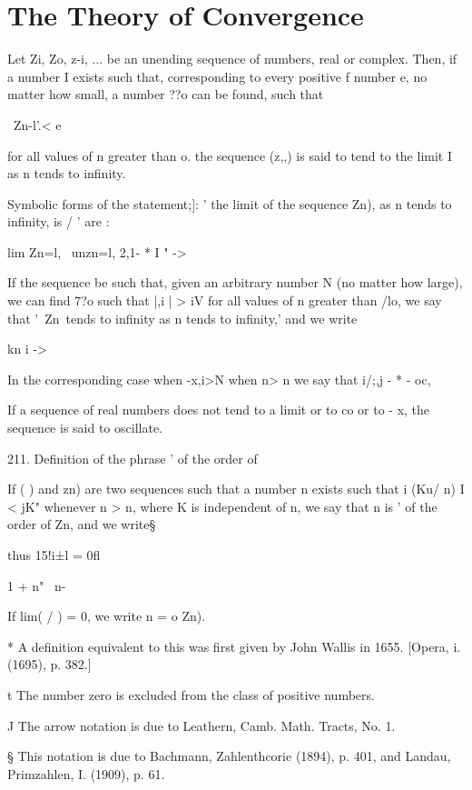 \chapter{The Theory of Convergence} 


Let Zi, Zo, z-i, ... be an unending sequence of numbers, real or
complex. Then, if a number I exists such that, corresponding to every
positive f number e, no matter how small, a number ??o can be found,
such that

\ Zn-l'.< e

for all values of n greater than o. the sequence (z,,) is said to tend
to the limit I as n tends to infinity.

Symbolic forms of the statement;]: ' the limit of the sequence Zn), as
n tends to infinity, is / ' are :

lim Zn=l, \ unzn=l, 2,1- * I " -> 

If the sequence be such that, given an arbitrary number N (no matter
how large), we can find 7?o such that |,i | > iV for all values of n
greater than /lo, we say that '\ Zn\ tends to infinity as n tends to
infinity,' and we write

kn i -> 

In the corresponding case when -x,i>N when n> n we say that i/;,j - *
- oc,

If a sequence of real numbers does not tend to a limit or to co or to
- x, the sequence is said to oscillate.

211. Definition of the phrase ' of the order of

If ( ) and zn) are two sequences such that a number n exists such
that i (Ku/ n) I < jK" whenever n > n, where K is independent of n,
we say that n is ' of the order of Zn, and we write§

thus 15!i±l = 0fl

1 + n" \ n-

If lim( / ) = 0, we write n = o Zn).

* A definition equivalent to this was first given by John Wallis in
1655. [Opera, i. (1695), p. 382.]

t The number zero is excluded from the class of positive numbers.

J The arrow notation is due to Leathern, Camb. Math. Tracts, No. 1.

§ This notation is due to Bachmann, Zahlenthcorie (1894), p. 401, and
Landau, Primzahlen, I. (1909), p. 61.

